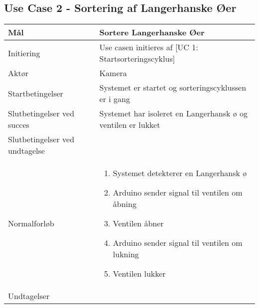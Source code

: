 \subsection{Use Case 2 - Sortering af Langerhanske Øer}
\label{uc:2}
\begin{center}
		\begin{longtable}{ | m{4cm} | m{8cm}| } 
			\hline
			Mål & Sortere Langerhanske Øer \\ 
			\hline
			Initiering &  Use casen initieres af [UC 1: Startsorteringscyklus]\\
			\hline
			Aktør & Kamera \\ 
			\hline
			Startbetingelser & Systemet er startet og sorteringscyklussen er i gang\\ 
			\hline	
			Slutbetingelser ved succes & Systemet har isoleret en Langerhansk ø og ventilen er lukket \\
			\hline
			Slutbetingelser ved undtagelse & \\
			\hline
			Normalforløb & \begin{enumerate}
				\item Systemet detekterer en Langerhansk ø
				\item Arduino sender signal til ventilen om åbning
				\item Ventilen åbner
				\item Arduino sender signal til ventilen om lukning
				\item Ventilen lukker
			\end{enumerate} \\ 
			\hline
			Undtagelser & \\
			\hline
		\end{longtable}
		
	\end{center}
	\pagebreak